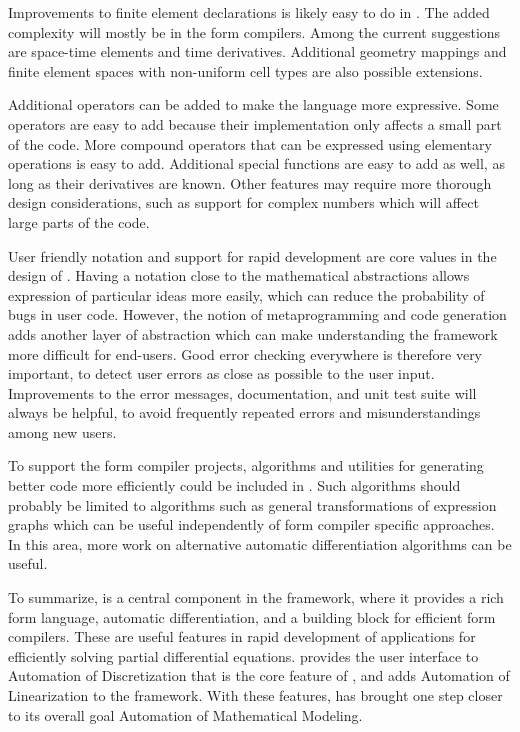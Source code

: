 Improvements to finite element declarations is likely easy to do in
\ufl{}. The added complexity will mostly be in the form compilers.
Among the current suggestions are space-time elements and time
derivatives.  Additional geometry mappings and finite element spaces
with non-uniform cell types are also possible extensions.

Additional operators can be added to make the language more
expressive. Some operators are easy to add because their
implementation only affects a small part of the code.  More compound
operators that can be expressed using elementary operations is easy to
add.  Additional special functions are easy to add as well, as long as
their derivatives are known.  Other features may require more thorough
design considerations, such as support for complex numbers which will
affect large parts of the code.

User friendly notation and support for rapid development are core
values in the design of \ufl{}.  Having a notation close to the
mathematical abstractions allows expression of particular ideas more
easily, which can reduce the probability of bugs in user code.
However, the notion of metaprogramming and code generation adds
another layer of abstraction which can make understanding the
framework more difficult for end-users.  Good error checking everywhere
is therefore very important, to detect user errors as close as
possible to the user input. Improvements to the error messages,
documentation, and unit test suite will always be helpful, to avoid
frequently repeated errors and misunderstandings among new users.

To support the form compiler projects, algorithms and utilities for
generating better code more efficiently could be included in \ufl{}.
Such algorithms should probably be limited to algorithms such as
general transformations of expression graphs which can be useful
independently of form compiler specific approaches.  In this area,
more work on alternative automatic differentiation algorithms
\citep{ForthTadjouddinePryceEtAl2004,Tadjouddine2008} can be useful.

To summarize, \ufl{} is a central component in the \fenics{}
framework, where it provides a rich form language,
automatic differentiation, and a building block for efficient
form compilers.  These are useful features in rapid
development of applications for efficiently solving partial
differential equations.  \ufl{} provides the user interface
to Automation of Discretization that is the core feature of
\fenics{}, and adds Automation of Linearization to the framework.
With these features, \ufl{} has brought \fenics{} one step closer
to its overall goal Automation of Mathematical Modeling.

